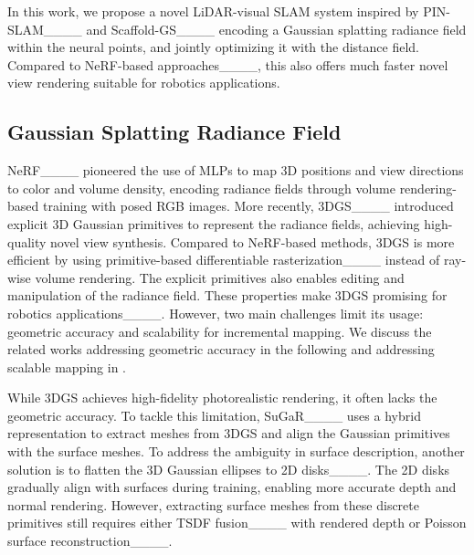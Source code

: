 In this work, we propose a novel LiDAR-visual SLAM system inspired by PIN-SLAM____ and Scaffold-GS____ encoding a Gaussian splatting radiance field within the neural points, and jointly optimizing it with the distance field.
%
Compared to NeRF-based approaches____, this also offers much faster novel view rendering suitable for robotics applications.



\subsection{Gaussian Splatting Radiance Field}

NeRF____ pioneered the use of MLPs to map 3D positions and view directions to color and volume density, encoding radiance fields through volume rendering-based training with posed RGB images.
%
More recently, 3DGS____ introduced explicit 3D Gaussian primitives to represent the radiance fields, achieving high-quality novel view synthesis.
%
Compared to NeRF-based methods, 3DGS is more efficient by using primitive-based differentiable rasterization____ instead of ray-wise volume rendering.
%
The explicit primitives also enables editing and manipulation of the radiance field.
%
These properties make 3DGS promising for robotics applications____.
%
However, two main challenges limit its usage: geometric accuracy and scalability for incremental mapping.
% 
We discuss the related works addressing geometric accuracy in the following and addressing scalable mapping in .



While 3DGS achieves high-fidelity photorealistic rendering, it often lacks the geometric accuracy. 
%
To tackle this limitation, SuGaR____ uses a hybrid representation to extract meshes from 3DGS and align the Gaussian primitives with the surface meshes.
%
To address the ambiguity in surface description, another solution is to flatten the 3D Gaussian ellipses to 2D disks____.
%
The 2D disks gradually align with surfaces during training, enabling more accurate depth and normal rendering.
%
However, extracting surface meshes from these discrete primitives still requires either TSDF fusion____ with rendered depth or Poisson surface reconstruction____. 
%


